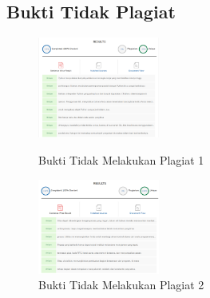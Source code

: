\subsection{Bukti Tidak Plagiat}
\begin{figure}[H]
	\includegraphics[width=4cm]{figures/kelompok1/1/tomy/plagiat_tomy_1.PNG}
	\centering
	\caption{Bukti Tidak Melakukan Plagiat 1}
    \includegraphics[width=4cm]{figures/kelompok1/1/tomy/plagiat_tomy_2.PNG}
	\centering
	\caption{Bukti Tidak Melakukan Plagiat 2}
\end{figure}
